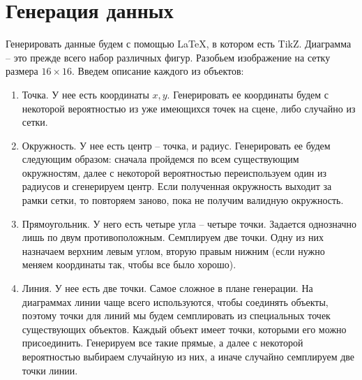 \documentclass{article}
\begin{document}
\section{Генерация данных}
Генерировать данные будем с помощью \LaTeX, в котором есть TikZ. Диаграмма -- это прежде всего набор различных фигур. Разобьем изображение на сетку размера $16\times16$. Введем описание каждого из объектов:
\begin{enumerate}
    \item Точка. У нее есть координаты $x, y$. Генерировать ее координаты будем с некоторой вероятностью из уже имеющихся точек на сцене, либо случайно из сетки.
    \item Окружность. У нее есть центр -- точка, и радиус. Генерировать ее будем следующим образом: сначала пройдемся по всем существующим окружностям, далее с некоторой вероятностью переиспользуем один из радиусов и сгенерируем центр. Если полученная окружность выходит за рамки сетки, то повторяем заново, пока не получим валидную окружность.
    \item Прямоугольник. У него есть четыре угла -- четыре точки. Задается однозначно лишь по двум противоположным. Семплируем две точки. Одну из них назначаем верхним левым углом, вторую правым нижним (если нужно меняем координаты так, чтобы все было хорошо).
    \item Линия. У нее есть две точки. Самое сложное в плане генерации. На диаграммах линии чаще всего используются, чтобы соединять объекты, поэтому точки для линий мы будем семплировать из специальных точек существующих объектов. Каждый объект имеет точки, которыми его можно присоединить. Генерируем все такие прямые, а далее с некоторой вероятностью выбираем случайную из них, а иначе случайно семплируем две точки линии.
\end{enumerate}
\end{document}
